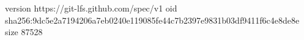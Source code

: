 version https://git-lfs.github.com/spec/v1
oid sha256:9dc5e2a7194206a7eb0240e119085fe44c7b2397e9831b03df9411f6c4e8de8e
size 87528

